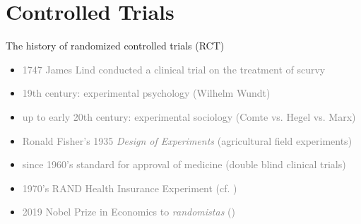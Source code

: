 \documentclass[aspectratio=169]{beamer}
\begin{document}
\section{Controlled Trials}
	\begin{frame}{The history of randomized controlled trials (RCT)}
		\begin{itemize}
			\item<2-> \textcolor<3->{gray}{1747 James Lind conducted a clinical trial on the treatment of scurvy}
			\item<3-> \textcolor<4->{gray}{19th century: experimental psychology (Wilhelm Wundt)}
			\item<4-> \textcolor<5->{gray}{up to early 20th century: experimental sociology (Comte vs. Hegel vs. Marx)}
			\item<5-> \textcolor<6->{gray}{Ronald Fisher's 1935 \textit{Design of Experiments} (agricultural field experiments)}
			\item<6-> \textcolor<7->{gray}{since 1960's standard for approval of medicine (double blind clinical trials)}
			\item<7-> \textcolor<8->{gray}{1970's RAND Health Insurance Experiment (cf. \cite{Angrist2015})}
			\item<8-> \textcolor<9->{gray}{2019 Nobel Prize in Economics to \textit{randomistas} (\cite{Banerjee2011})}
		\end{itemize}
		\vspace*{.25cm}
	\end{frame}

\end{document}
